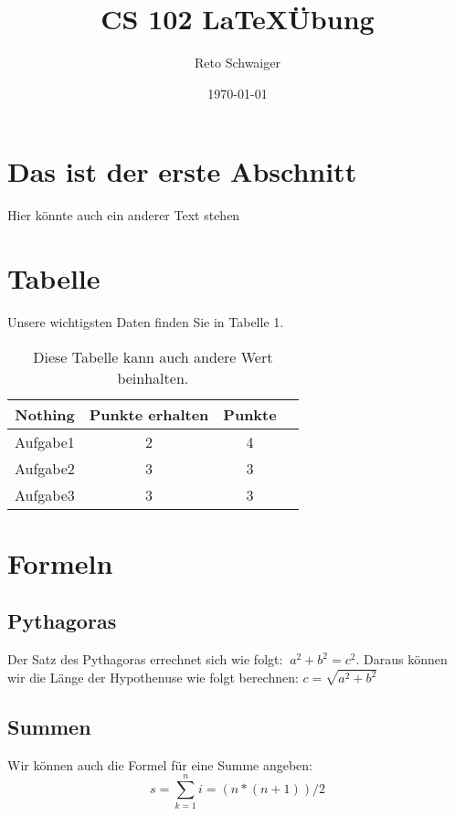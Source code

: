 \documentclass{article}
\title{\huge CS 102 \LaTeX Übung}
\author{Reto Schwaiger}
\date{\today}
\begin{document}
\maketitle

\section{Das ist der erste Abschnitt}
\begin{description}
\item Hier könnte auch ein anderer Text stehen
\end{description}
\section{Tabelle}
\begin{description}
\item Unsere wichtigsten Daten finden Sie in Tabelle 1.
\end{description}

\begin{table}
\centering
\begin{tabular}{r|c|c|c}
Nothing & Punkte erhalten & Punkte \\\hline
Aufgabe1 & 2 & 4 \\
Aufgabe2 & 3 & 3 \\
Aufgabe3 & 3 & 3
\end{tabular}
\caption{\label{tab:Werte}Diese Tabelle kann auch andere Wert beinhalten.}
\end{table}

\section{Formeln}
\subsection{Pythagoras}
\begin{description}
\item Der Satz des Pythagoras errechnet sich wie folgt: $\ a^2 + b^2 = c^2 $. Daraus können wir die Länge der Hypothenuse wie folgt berechnen: $c=\sqrt{a^2 + b^2}$
\end{description}

\subsection{Summen}
\begin{description}
\item Wir können auch die Formel für eine Summe angeben:
\begin{equation}
s=\sum_{k=1}^n i=(n*(n+1))/2
\end{equation}
\end{description}
\end{document}
